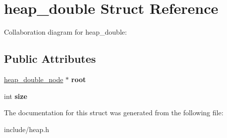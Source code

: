 \hypertarget{structheap__double}{}\section{heap\+\_\+double Struct Reference}
\label{structheap__double}


Collaboration diagram for heap\+\_\+double\+:
\subsection*{Public Attributes}
\begin{DoxyCompactItemize}
\item 
\hyperlink{structheap__double__node}{heap\+\_\+double\+\_\+node} $\ast$ {\bfseries root}\hypertarget{structheap__double_a5152da1a67956e758f18754270af02b5}{}\label{structheap__double_a5152da1a67956e758f18754270af02b5}

\item 
int {\bfseries size}\hypertarget{structheap__double_ad622060ad6f50fcc9d3b8368900f6202}{}\label{structheap__double_ad622060ad6f50fcc9d3b8368900f6202}

\end{DoxyCompactItemize}


The documentation for this struct was generated from the following file\+:\begin{DoxyCompactItemize}
\item 
include/heap.\+h\end{DoxyCompactItemize}
